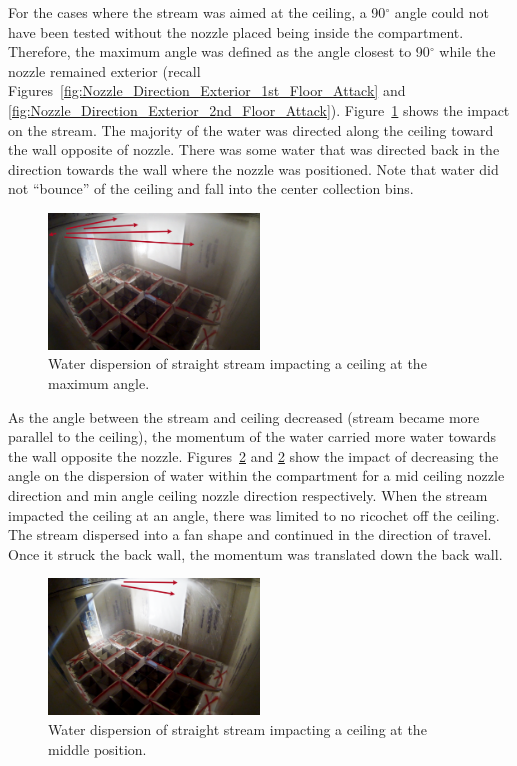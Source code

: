 \documentclass[12pt,oneside]{book}
\begin{document}
For the cases where the stream was aimed at the ceiling, a 90$^{\circ}$ angle could not have been tested without the nozzle placed being inside the compartment. Therefore, the maximum angle was defined as the angle closest to 90$^{\circ}$ while the nozzle remained exterior (recall Figures~\ref{fig:Nozzle_Direction_Exterior_1st_Floor_Attack} and \ref{fig:Nozzle_Direction_Exterior_2nd_Floor_Attack}). Figure~\ref{fig:MaxAngleCeilingImpact} shows the impact on the stream. The majority of the water was directed along the ceiling toward the wall opposite of nozzle. There was some water that was directed back in the direction towards the wall where the nozzle was positioned. Note that water did not ``bounce'' of the ceiling and fall into the center collection bins.

\begin{figure}[!ht]
\centering
\includegraphics[width=0.5\textwidth]{Figures/Water_Distribution/Nozzle_Directions/Exterior_MaxAngleCeiling_SS_Arrows} 
\caption[Water Dispersion Straight Stream Max Angle Ceiling]{Water dispersion of straight stream impacting a ceiling at the maximum angle.}
\label{fig:MaxAngleCeilingImpact}
\end{figure}

As the angle between the stream and ceiling decreased (stream became more parallel to the ceiling), the momentum of the water carried more water towards the wall opposite the nozzle. Figures~\ref{fig:MidCeilingImpact} and \ref{fig:MidCeilingImpact} show the impact of decreasing the angle on the dispersion of water within the compartment for a mid ceiling nozzle direction and min angle ceiling nozzle direction respectively. When the stream impacted the ceiling at an angle, there was limited to no ricochet off the ceiling. The stream dispersed into a fan shape and continued in the direction of travel. Once it struck the back wall, the momentum was translated down the back wall. 

\begin{figure}[!ht]
\centering
\includegraphics[width=0.5\textwidth]{Figures/Water_Distribution/Nozzle_Directions/Exterior_MidCeiling_SS_Arrows}
\caption[Water Dispersion Straight Stream Middle Position Ceiling]{Water dispersion of straight stream impacting a ceiling at the middle position.}
\label{fig:MidCeilingImpact}
\end{figure}
\end{document}
